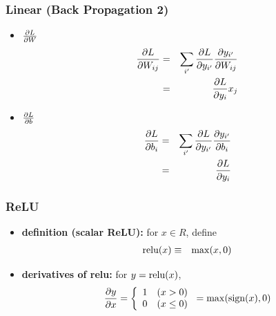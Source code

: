 \documentclass[12pt,dvipdfmx]{beamer}
\newcommand{\ao}[1]{{\color{blue}#1}}
\begin{document}
\begin{frame}
\frametitle{Linear (Back Propagation 2)}
\begin{itemize}
\item $\frac{\partial L}{\partial W}$
  \begin{eqnarray*}
    \frac{\partial L}{\partial W_{ij}} 
    & = & \sum_{i'} \frac{\partial L}{\partial y_{i'}} \frac{\partial y_{i'}}{\partial W_{ij}} \\
    & = & \frac{\partial L}{\partial y_{i}} x_j
  \end{eqnarray*}
  
\item $\frac{\partial L}{\partial b}$
  \begin{eqnarray*}
    \frac{\partial L}{\partial b_i} 
    & = & \sum_{i'} \frac{\partial L}{\partial y_{i'}} \frac{\partial y_{i'}}{\partial b_i} \\
    & = & \frac{\partial L}{\partial y_{i}}
  \end{eqnarray*}
\end{itemize}
\end{frame}

\begin{frame}
\frametitle{ReLU}
\begin{itemize}
\item \ao{\textbf{definition (scalar ReLU):}}
for $x \in R$, define
\begin{eqnarray*}
\mbox{relu}(x) & \equiv & \max(x, 0) 
\end{eqnarray*}

\item \ao{\textbf{derivatives of relu:}} for $y = \mbox{relu}(x)$, 
\[ \frac{\partial y}{\partial x} = \left\{
\begin{array}{ll}
1 & (x > 0) \\
0 & (x \leq 0)
\end{array}
\right. 
= \max(\mbox{sign}(x), 0)
\]
\end{itemize}

\begin{center}
\def\svgwidth{0.6\textwidth}

\end{center}
\end{frame}
\end{document}
